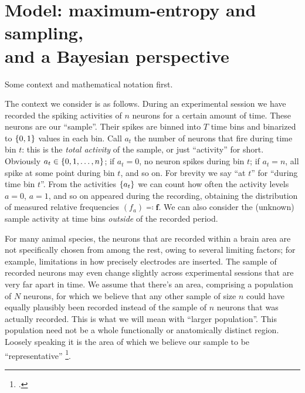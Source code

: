 \documentclass[\ifafour a4paper,12pt,\else a5paper,10pt,\fi%
onecolumn,oneside,article,%
british%
]{memoir}
\theoremstyle{remark}
\theoremstyle{innote}
\newcommand*{\citep}{\footcites}
\newcommand*{\defs}{\eqqcolon}
\DeclarePairedDelimiter\set{\{}{\}}
\renewcommand*{\|}{\nonscript\,\vert\nonscript\;\mathopen{}}
\newcommand*{\puzzle}{{\fontencoding{U}\fontfamily{fontawesometwo}\selectfont\symbol{225}}}
\newcommand{\mynote}[1]{ {\color{notecolour}\puzzle\ #1}}
\newcommand*{\yav}{a}
\newcommand*{\yff}{f}
\newcommand*{\yf}{\bm{\yff}}
\newcommand*{\ya}{\yav}%
\begin{document}



\section{Model: maximum-entropy and sampling,\\ and a Bayesian perspective}
\label{sec:model}

Some context and mathematical notation first.

The context we consider is as follows. During an experimental session we
have recorded the spiking activities of $n$ neurons for a certain amount of
time. These neurons are our \enquote{sample}. Their spikes are binned into
$T$ time bins and binarized to $\set{0,1}$ values in each bin. Call
$\ya_{t}$ the number of neurons that fire during time bin $t$: this is the
\emph{total activity} of the sample, or just \enquote{activity} for short.
Obviously $\ya_{t} \in\set{0,1,\dotsc,n}$; if $\ya_{t}=0$, no neuron spikes
during bin $t$; if $\ya_{t}=n$, all spike at some point during bin $t$, and
so on. For brevity we say \enquote{at $t$} for \enquote{during time bin
  $t$}. %
From the activities $\set{\ya_{t}}$
we can count how often the activity levels $\ya=0$, $\ya=1$, and so on
appeared during the recording, obtaining the distribution of measured
relative frequencies $(\yff_{\ya}) \defs \yf$. We can also consider the
(unknown) sample activity at time bins \emph{outside} of the recorded
period.


For many animal species, the neurons that are recorded within a brain area
are not specifically chosen from among the rest, owing to several limiting
factors; for example, limitations in how precisely electrodes are inserted.
The sample of recorded neurons may even change slightly across experimental
sessions that are very far apart in time. We assume that there's an area,
comprising a population of $N$ neurons, for which we believe that any other
sample of size $n$ could have equally plausibly been recorded instead of
the sample of $n$ neurons that was actually recorded. This is what we will
mean with \enquote{larger population}. This population need not be a whole
functionally or anatomically distinct region. Loosely speaking it is the
area of which we believe our sample to be \enquote{representative}
\citep[we intend this term in the Meaning~2 of][]{kruskaletal1979b}[or
Meanings~8 and~9 of][]{kruskaletal1979c}.
\end{document}
